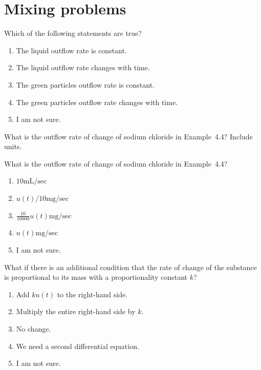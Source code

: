 \documentclass[aspectratio=169, t, 14pt]{beamer}
\begin{document}
\section{Mixing problems}

\begin{frame}
  Which of the following statements are true?

  \begin{enumerate} 
    \item The liquid outflow rate is constant.
    \item The liquid outflow rate changes with time.
    \item The green particles outflow rate is constant.
    \item The green particles outflow rate changes with time.
    \item I am not sure.
  \end{enumerate} 
\end{frame}

\begin{frame}[c]
  What is the outflow rate of change of sodium chloride in Example~4.4? Include units.
\end{frame}

\begin{frame}[c]
  What is the outflow rate of change of sodium chloride in Example~4.4?

  \begin{enumerate}
    \item \(10 \text{mL}/\text{sec}\) 
    \item \(u(t)/10 \text{mg}/\text{sec}\) 
    \item \(\frac{10}{10000} u(t) \text{mg}/\text{sec}\) 
    \item \(u(t) \text{mg}/\text{sec}\) 
    \item I am not sure.
  \end{enumerate}
\end{frame}

\begin{frame}[c]
  What if there is an additional condition that the rate of change of the substance is proportional to its mass with a proportionality constant \(k\)?

  \begin{enumerate}
    \item Add \(k u(t)\) to the right-hand side.
    \item Multiply the entire right-hand side by \(k\).
    \item No change.
    \item We need a second differential equation.
    \item I am not sure.
  \end{enumerate}
\end{frame}
\end{document}
